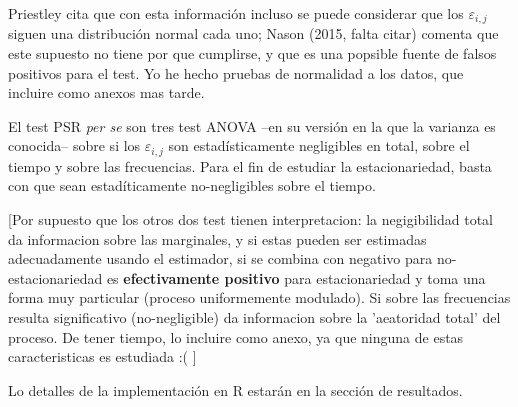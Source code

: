 Priestley cita que con esta informaci\'on incluso se puede considerar que los $\varepsilon_{i,j}$
siguen una distribuci\'on normal cada uno; Nason (2015, falta citar) comenta que
este supuesto no tiene por que cumplirse, y que es una popsible fuente de falsos positivos
para el test. Yo he hecho pruebas de normalidad a los datos, que incluire como anexos
mas tarde.

El test PSR \textit{per se} son tres test ANOVA --en su versi\'on en la que la varianza es conocida--
sobre si los $\varepsilon_{i,j}$ son estad\'isticamente negligibles en total, sobre el tiempo y sobre
las frecuencias. Para el fin de estudiar la estacionariedad, basta con que sean estad\'iticamente
no-negligibles sobre el tiempo.

[Por supuesto que los otros dos test tienen interpretacion: la negigibilidad total da informacion
sobre las marginales, y si estas pueden ser estimadas adecuadamente usando el estimador, si se
combina con negativo para no-estacionariedad es \textbf{efectivamente positivo} para estacionariedad
y toma una forma muy particular (proceso uniformemente modulado). Si sobre las frecuencias resulta
significativo (no-negligible) da informacion sobre la 'aeatoridad total' del proceso.
De tener tiempo, lo incluire como anexo, ya que ninguna de estas caracteristicas es estudiada :( ]

Lo detalles de la implementaci\'on en R estar\'an en la secci\'on de resultados.

